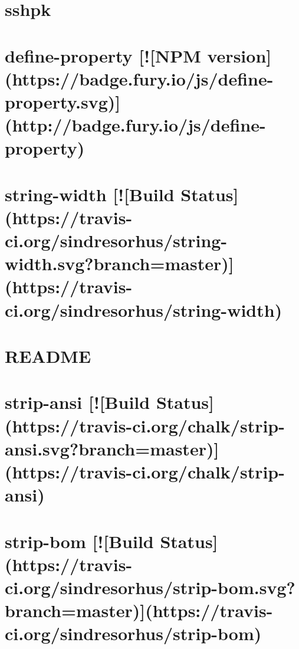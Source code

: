 \documentclass[twoside]{book}
\newcommand{\+}{\discretionary{\mbox{\scriptsize$\hookleftarrow$}}{}{}}
\begin{document}
\chapter{sshpk}
\label{md_dsmacc_vis_degree_node_modules_sshpk_README}

\chapter{define-\/property \mbox{[}!\mbox{[}N\+PM version\mbox{]}(https\+://badge.fury.\+io/js/define-\/property.svg)\mbox{]}(http\+://badge.fury.\+io/js/define-\/property)}
\label{md_dsmacc_vis_degree_node_modules_static-extend_node_modules_define-property_README}

\chapter{string-\/width \mbox{[}!\mbox{[}Build Status\mbox{]}(https\+://travis-\/ci.org/sindresorhus/string-\/width.svg?branch=master)\mbox{]}(https\+://travis-\/ci.org/sindresorhus/string-\/width)}
\label{md_dsmacc_vis_degree_node_modules_string-width_readme}

\chapter{R\+E\+A\+D\+ME}
\label{md_dsmacc_vis_degree_node_modules_string_decoder_README}

\chapter{strip-\/ansi \mbox{[}!\mbox{[}Build Status\mbox{]}(https\+://travis-\/ci.org/chalk/strip-\/ansi.svg?branch=master)\mbox{]}(https\+://travis-\/ci.org/chalk/strip-\/ansi)}
\label{md_dsmacc_vis_degree_node_modules_strip-ansi_readme}

\chapter{strip-\/bom \mbox{[}!\mbox{[}Build Status\mbox{]}(https\+://travis-\/ci.org/sindresorhus/strip-\/bom.svg?branch=master)\mbox{]}(https\+://travis-\/ci.org/sindresorhus/strip-\/bom)}
\label{md_dsmacc_vis_degree_node_modules_strip-bom_readme}

\end{document}
